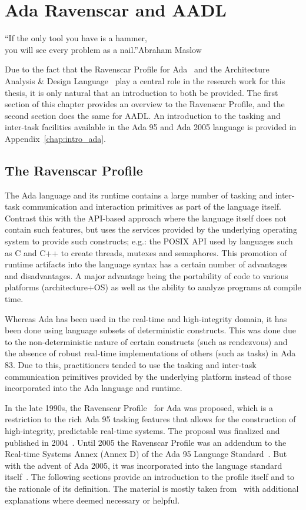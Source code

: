 \chapter{Ada Ravenscar and AADL}{``If the only tool you
  have is a hammer,\\you will see every problem as a nail.''}{Abraham
    Maslow}
\label{chap:aadlrs}

Due to the fact that the Ravenscar Profile for
Ada~\cite{burns@adalett04} and the Architecture Analysis \& Design
Language~\cite{AS5506} play a central role in the research work for
this thesis, it is only natural that an introduction to both be
provided. The first section of this chapter provides an overview to
the Ravenscar Profile, and the second section does the same for
AADL. An introduction to the tasking and inter-task facilities
available in the Ada 95 and Ada 2005 language is provided in
Appendix~\ref{chap:intro_ada}. 

\section{The Ravenscar Profile}
\label{sec:rsp}
The Ada language and its runtime contains a large number of tasking
and inter-task communication and interaction primitives as part of the
language itself. Contrast this with the API-based approach where the
language itself does not contain such features, but uses the services
provided by the underlying operating system to provide such
constructs; e.g.: the POSIX API used by languages such as C and C++ to
create threads, mutexes and semaphores. This promotion of runtime
artifacts into the language syntax has a certain number of advantages
and disadvantages. A major advantage being the portability of code to
various platforms (architecture+OS) as well as the ability to analyze
programs at compile time.

Whereas Ada has been used in the real-time and high-integrity domain,
it has been done using language subsets of deterministic
constructs. This was done due to the non-deterministic nature of
certain constructs (such as rendezvous) and the absence of robust
real-time implementations of others (such as tasks) in Ada 83. Due to
this, practitioners tended to use the tasking and inter-task
communication primitives provided by the underlying platform instead
of those incorporated into the Ada language and runtime.

In the late 1990s, the Ravenscar Profile~\cite{burns@adalett99} for
Ada was proposed, which is a restriction to the rich Ada 95 tasking
features that allows for the construction of high-integrity,
predictable real-time systems. The proposal was finalized and
published in 2004~\cite{burns@adalett04}. Until 2005 the Ravenscar
Profile was an addendum to the Real-time Systems Annex (Annex D) of
the Ada 95 Language Standard~\cite{arm95}. But with the advent of Ada
2005, it was incorporated into the language standard
itself~\cite{arm05}. The following sections provide an introduction to
the profile itself and to the rationale of its definition. The
material is mostly taken from~\cite{burns@adalett04} with additional
explanations where deemed necessary or helpful.

